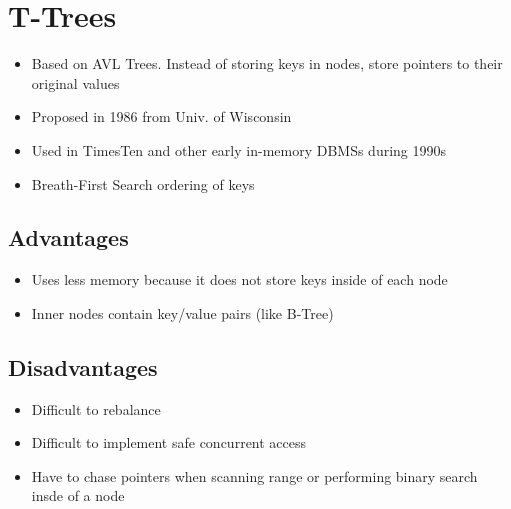 \documentclass[11pt]{article}
\begin{document}
\maketitle
\thispagestyle{plain}

\section{T-Trees ~\cite{P294}}
\begin{itemize}
    \item Based on AVL Trees. Instead of storing keys in nodes, store pointers to their original values
    \item Proposed in 1986 from Univ. of Wisconsin
    \item Used in TimesTen and other early in-memory DBMSs during 1990s
    \item Breath-First Search ordering of keys
\end{itemize}
\subsection*{Advantages}
    \begin{itemize}
        \item Uses less memory because it does not store keys inside of each node
        \item Inner nodes contain key/value pairs (like B-Tree)
    \end{itemize}
\subsection*{Disadvantages}
    \begin{itemize}
        \item Difficult to rebalance
        \item Difficult to implement safe concurrent access
        \item Have to chase pointers when scanning range or performing binary search insde of a node
    \end{itemize}
\end{document}
